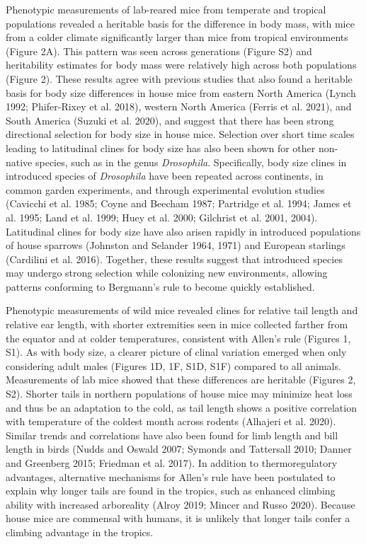 \documentclass[
]{article}
\begin{document}
Phenotypic measurements of lab-reared mice from temperate and tropical
populations revealed a heritable basis for the difference in body mass,
with mice from a colder climate significantly larger than mice from
tropical environments (Figure 2A). This pattern was seen across
generations (Figure S2) and heritability estimates for body mass were
relatively high across both populations (Figure 2). These results agree
with previous studies that also found a heritable basis for body size
differences in house mice from eastern North America (Lynch 1992;
Phifer-Rixey et al. 2018), western North America (Ferris et al. 2021),
and South America (Suzuki et al. 2020), and suggest that there has been
strong directional selection for body size in house mice. Selection over
short time scales leading to latitudinal clines for body size has also
been shown for other non-native species, such as in the genus
\emph{Drosophila}. Specifically, body size clines in introduced species
of \emph{Drosophila} have been repeated across continents, in common
garden experiments, and through experimental evolution studies (Cavicchi
et al. 1985; Coyne and Beecham 1987; Partridge et al. 1994; James et al.
1995; Land et al. 1999; Huey et al. 2000; Gilchrist et al. 2001, 2004).
Latitudinal clines for body size have also arisen rapidly in introduced
populations of house sparrows (Johnston and Selander 1964, 1971) and
European starlings (Cardilini et al. 2016). Together, these results
suggest that introduced species may undergo strong selection while
colonizing new environments, allowing patterns conforming to Bergmann's
rule to become quickly established.

Phenotypic measurements of wild mice revealed clines for relative tail
length and relative ear length, with shorter extremities seen in mice
collected farther from the equator and at colder temperatures,
consistent with Allen's rule (Figures 1, S1). As with body size, a
clearer picture of clinal variation emerged when only considering adult
males (Figures 1D, 1F, S1D, S1F) compared to all animals. Measurements
of lab mice showed that these differences are heritable (Figures 2, S2).
Shorter tails in northern populations of house mice may minimize heat
loss and thus be an adaptation to the cold, as tail length shows a
positive correlation with temperature of the coldest month across
rodents (Alhajeri et al. 2020). Similar trends and correlations have
also been found for limb length and bill length in birds (Nudds and
Oswald 2007; Symonds and Tattersall 2010; Danner and Greenberg 2015;
Friedman et al. 2017). In addition to thermoregulatory advantages,
alternative mechanisms for Allen's rule have been postulated to explain
why longer tails are found in the tropics, such as enhanced climbing
ability with increased arboreality (Alroy 2019; Mincer and Russo 2020).
Because house mice are commensal with humans, it is unlikely that longer
tails confer a climbing advantage in the tropics.
\end{document}
